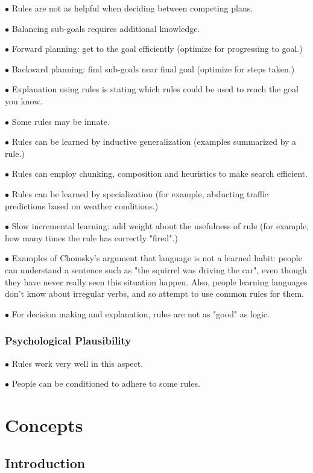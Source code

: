 \documentclass[english,openany]{book}
\begin{document}
$\bullet$ Rules are not as helpful when deciding between competing plans.

$\bullet$ Balancing sub-goals requires additional knowledge.

$\bullet$ Forward planning: get to the goal efficiently (optimize for progressing to goal.)

$\bullet$ Backward planning: find sub-goals near final goal (optimize for steps taken.)

$\bullet$ Explanation using rules is stating which rules could be used to reach the goal you know.

$\bullet$ Some rules may be innate.

$\bullet$ Rules can be learned by inductive generalization (examples summarized by a rule.)

$\bullet$ Rules can employ chunking, composition and heuristics to make search efficient.

$\bullet$ Rules can be learned by specialization (for example, abducting traffic predictions based on weather conditions.)

$\bullet$ Slow incremental learning: add weight about the usefulness of rule (for example, how many times the rule has correctly "fired".)

$\bullet$ Examples of Chomsky's argument that language is not a learned habit: people can understand a sentence such as "the squirrel was driving the car", even though they have never really seen this situation happen. Also, people learning languages don't know about irregular verbs, and so attempt to use common rules for them.

$\bullet$ For decision making and explanation, rules are not as "good" as logic.

\subsection{Psychological Plausibility}

$\bullet$ Rules work very well in this aspect.

$\bullet$ People can be conditioned to adhere to some rules.

\chapter{Concepts}

\section{Introduction}
\end{document}
